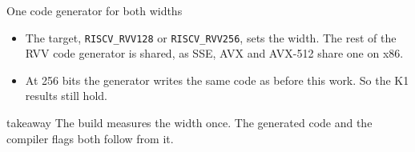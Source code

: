 \documentclass[aspectratio=169,10pt,t]{beamer}
\newcommand{\code}[1]{\texttt{#1}}
\newcommand{\takeaway}[1]{\par\vfill
  \begin{beamercolorbox}[wd=\textwidth,sep=4pt,rounded=true]{takeaway}
    \small #1
  \end{beamercolorbox}}
\begin{document}
\begin{frame}{One code generator for both widths}
  \vspace{4mm}
  \centering\resizebox{\textwidth}{!}{}

  \vspace{4mm}
  \raggedright
  \begin{itemize}\small
    \item The target, \code{RISCV\_RVV128} or \code{RISCV\_RVV256}, sets the width. The rest of the RVV code
          generator is shared, as SSE, AVX and AVX-512 share one on x86.
    \item At 256 bits the generator writes the same code as before this work. So the K1 results still hold.
  \end{itemize}
  \takeaway{The build measures the width once. The generated code and the compiler flags both follow from it.}
\end{frame}
\end{document}
